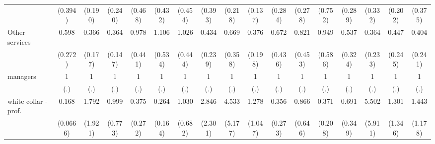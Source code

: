 {\begin{tabular}{l*{16}{c}}
                    &     (0.394)         &     (0.190)         &     (0.240)         &     (0.468)         &     (0.432)         &     (0.454)         &     (0.393)         &     (0.218)         &     (0.137)         &     (0.284)         &     (0.278)         &     (0.752)         &     (0.289)         &     (0.332)         &     (0.202)         &     (0.375)         \\
[1em]
Other services      &       0.598         &       0.366\sym{*}  &       0.364\sym{*}  &       0.978         &       1.106         &       1.026         &       0.434         &       0.669         &       0.376         &       0.672         &       0.821         &       0.949         &       0.537         &       0.364         &       0.447         &       0.404         \\
                    &     (0.272)         &     (0.177)         &     (0.147)         &     (0.441)         &     (0.534)         &     (0.444)         &     (0.239)         &     (0.358)         &     (0.198)         &     (0.436)         &     (0.453)         &     (0.586)         &     (0.324)         &     (0.233)         &     (0.245)         &     (0.241)         \\
[1em]
managers            &           1         &           1         &           1         &           1         &           1         &           1         &           1         &           1         &           1         &           1         &           1         &           1         &           1         &           1         &           1         &           1         \\
                    &         (.)         &         (.)         &         (.)         &         (.)         &         (.)         &         (.)         &         (.)         &         (.)         &         (.)         &         (.)         &         (.)         &         (.)         &         (.)         &         (.)         &         (.)         &         (.)         \\
[1em]
white collar - prof.&       0.168\sym{***}&       1.792         &       0.999         &       0.375         &       0.264\sym{*}  &       1.030         &       2.846         &       4.533         &       1.278         &       0.356         &       0.866         &       0.371         &       0.691         &       5.502         &       1.301         &       1.443         \\
                    &    (0.0666)         &     (1.921)         &     (0.773)         &     (0.272)         &     (0.164)         &     (0.682)         &     (2.301)         &     (5.177)         &     (1.047)         &     (0.273)         &     (0.646)         &     (0.208)         &     (0.349)         &     (5.911)         &     (1.346)         &     (1.178)         \\

\end{tabular}}
